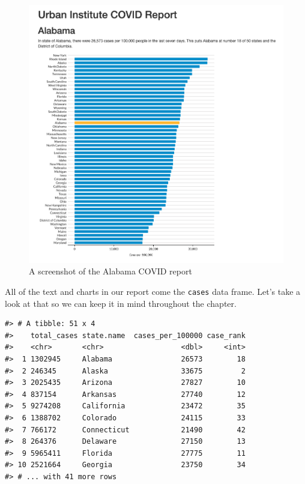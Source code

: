 \documentclass[
]{book}
\begin{document}
\begin{figure}
\includegraphics[width=1\linewidth]{assets/alabama-covid-report} \caption{A screenshot of the Alabama COVID report}\label{fig:alabama-covid-report}
\end{figure}

All of the text and charts in our report come the \texttt{cases} data frame. Let's take a look at that so we can keep it in mind throughout the chapter.

\begin{verbatim}
#> # A tibble: 51 x 4
#>    total_cases state.name  cases_per_100000 case_rank
#>    <chr>       <chr>                  <dbl>     <int>
#>  1 1302945     Alabama                26573        18
#>  2 246345      Alaska                 33675         2
#>  3 2025435     Arizona                27827        10
#>  4 837154      Arkansas               27740        12
#>  5 9274208     California             23472        35
#>  6 1388702     Colorado               24115        33
#>  7 766172      Connecticut            21490        42
#>  8 264376      Delaware               27150        13
#>  9 5965411     Florida                27775        11
#> 10 2521664     Georgia                23750        34
#> # ... with 41 more rows
\end{verbatim}
\end{document}
